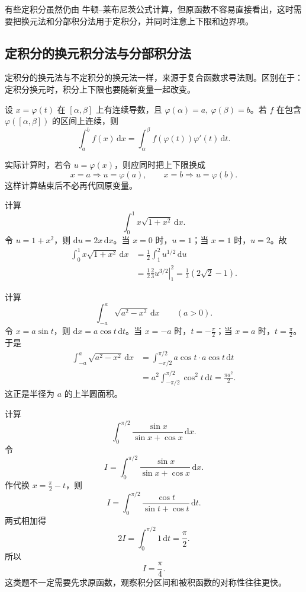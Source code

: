 \documentclass[fontset=fandol]{ctexart}
\newcommand{\dd}{\mathrm{d}}
\begin{document}
有些定积分虽然仍由 牛顿--莱布尼茨公式计算，但原函数不容易直接看出，这时需要把换元法和分部积分法用于定积分，并同时注意上下限和边界项。

\subsection{定积分的换元积分法与分部积分法}

定积分的换元法与不定积分的换元法一样，来源于复合函数求导法则。区别在于：定积分换元时，积分上下限也要随新变量一起改变。

\begin{theorem}[定积分的换元公式]
设 \(x=\varphi(t)\) 在 \([\alpha,\beta]\) 上有连续导数，且 \(\varphi(\alpha)=a,\ \varphi(\beta)=b\)。若 \(f\) 在包含 \(\varphi([\alpha,\beta])\) 的区间上连续，则
\[
\int_a^b f(x)\,\dd x
=\int_{\alpha}^{\beta}f(\varphi(t))\varphi'(t)\,\dd t.
\]
\end{theorem}

实际计算时，若令 $u=\varphi(x)$，则应同时把上下限换成
\[
x=a\Rightarrow u=\varphi(a),\qquad x=b\Rightarrow u=\varphi(b).
\]
这样计算结束后不必再代回原变量。

\begin{example}[换元后改变上下限]
计算
\[
\int_0^1 x\sqrt{1+x^2}\,\dd x.
\]
令 $u=1+x^2$，则 $\dd u=2x\,\dd x$。当 $x=0$ 时，$u=1$；当 $x=1$ 时，$u=2$。故
\[
\begin{aligned}
\int_0^1 x\sqrt{1+x^2}\,\dd x
&=\frac12\int_1^2 u^{1/2}\,\dd u\\
&=\frac12\left.\frac23u^{3/2}\right|_1^2
=\frac13(2\sqrt2-1).
\end{aligned}
\]
\end{example}

\begin{example}[半圆面积]
计算
\[
\int_{-a}^{a}\sqrt{a^2-x^2}\,\dd x\qquad(a>0).
\]
令 $x=a\sin t$，则 $\dd x=a\cos t\,\dd t$。当 $x=-a$ 时，$t=-\frac{\pi}{2}$；当 $x=a$ 时，$t=\frac{\pi}{2}$。于是
\[
\begin{aligned}
\int_{-a}^{a}\sqrt{a^2-x^2}\,\dd x
&=\int_{-\pi/2}^{\pi/2}a\cos t\cdot a\cos t\,\dd t\\
&=a^2\int_{-\pi/2}^{\pi/2}\cos^2t\,\dd t
=\frac{\pi a^2}{2}.
\end{aligned}
\]
这正是半径为 $a$ 的上半圆面积。
\end{example}

\begin{example}[对称性与换元结合]
计算
\[
\int_0^{\pi/2}\frac{\sin x}{\sin x+\cos x}\,\dd x.
\]
令
\[
I=\int_0^{\pi/2}\frac{\sin x}{\sin x+\cos x}\,\dd x.
\]
作代换 $x=\frac{\pi}{2}-t$，则
\[
I=\int_0^{\pi/2}\frac{\cos t}{\sin t+\cos t}\,\dd t.
\]
两式相加得
\[
2I=\int_0^{\pi/2}1\,\dd t=\frac{\pi}{2}.
\]
所以
\[
I=\frac{\pi}{4}.
\]
这类题不一定需要先求原函数，观察积分区间和被积函数的对称性往往更快。
\end{example}
\end{document}
